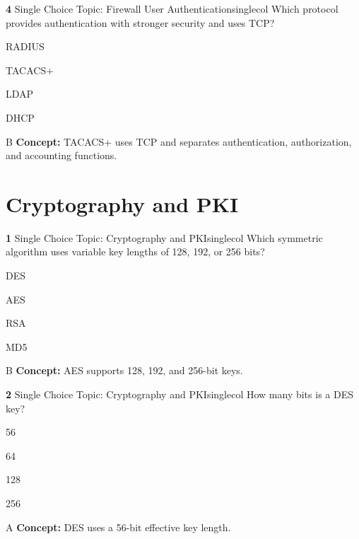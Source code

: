 \documentclass[10pt,a4paper]{article}
\begin{document}
\begin{qcard}{\color{white}\textbf{4} \hfill \small Single Choice \textbar{} Topic: Firewall User Authentication}{singlecol}
Which protocol provides authentication with stronger security and uses TCP?

\begin{qoptions}
\item RADIUS
\item TACACS+
\item LDAP
\item DHCP
\end{qoptions}
\begin{explainbox}{B}
\textbf{Concept:} TACACS+ uses TCP and separates authentication, authorization, and accounting functions.
\end{explainbox}
\end{qcard}

\section{Cryptography and PKI}
\begin{qcard}{\color{white}\textbf{1} \hfill \small Single Choice \textbar{} Topic: Cryptography and PKI}{singlecol}
Which symmetric algorithm uses variable key lengths of 128, 192, or 256 bits?

\begin{qoptions}
\item DES
\item AES
\item RSA
\item MD5
\end{qoptions}
\begin{explainbox}{B}
\textbf{Concept:} AES supports 128, 192, and 256-bit keys.
\end{explainbox}
\end{qcard}

\begin{qcard}{\color{white}\textbf{2} \hfill \small Single Choice \textbar{} Topic: Cryptography and PKI}{singlecol}
How many bits is a DES key?

\begin{qoptions}
\item 56
\item 64
\item 128
\item 256
\end{qoptions}
\begin{explainbox}{A}
\textbf{Concept:} DES uses a 56-bit effective key length.
\end{explainbox}
\end{qcard}
\end{document}
